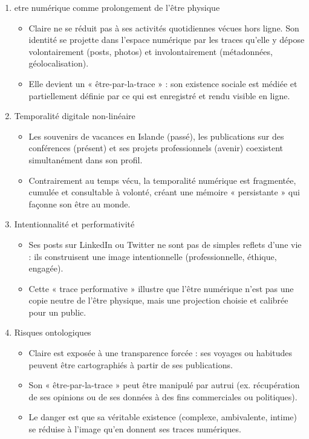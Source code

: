 \documentclass[12pt,a4paper]{article}
\begin{document}
	     \begin{enumerate}
	     	\item etre numérique comme prolongement de l’être physique
	     	\begin{itemize}
	     		\item Claire ne se réduit pas à ses activités quotidiennes vécues hors ligne. Son identité se projette dans l’espace numérique par les traces qu’elle y dépose volontairement (posts, photos) et involontairement (métadonnées, géolocalisation).
	     		\item  Elle devient un « être-par-la-trace » : son existence sociale est médiée et partiellement définie par ce qui est enregistré et rendu visible en ligne.
	     	\end{itemize}
	     	\item Temporalité digitale non-linéaire
	     	\begin{itemize}
	     		\item Les souvenirs de vacances en Islande (passé), les publications sur des conférences (présent) et ses projets professionnels (avenir) coexistent simultanément dans son profil.
	     		\item Contrairement au temps vécu, la temporalité numérique est fragmentée, cumulée et consultable à volonté, créant une mémoire « persistante » qui façonne son être au monde.
	     	\end{itemize}
	     	\item Intentionnalité et performativité
	     	\begin{itemize}
	     		\item Ses posts sur LinkedIn ou Twitter ne sont pas de simples reflets d’une vie : ils construisent une image intentionnelle (professionnelle, éthique, engagée). 
	     		\item Cette « trace performative » illustre que l’être numérique n’est pas une copie neutre de l’être physique, mais une projection choisie et calibrée pour un public.
	     	\end{itemize}
	     	\item Risques ontologiques
	     	\begin{itemize}
	     		\item Claire est exposée à une transparence forcée : ses voyages ou habitudes peuvent être cartographiés à partir de ses publications.
	     		\item Son « être-par-la-trace » peut être manipulé par autrui (ex. récupération de ses opinions ou de ses données à des fins commerciales ou politiques).
	     		\item Le danger est que sa véritable existence (complexe, ambivalente, intime) se réduise à l’image qu’en donnent ses traces numériques.
	     	\end{itemize}
	     \end{enumerate}
	      
\end{document}
